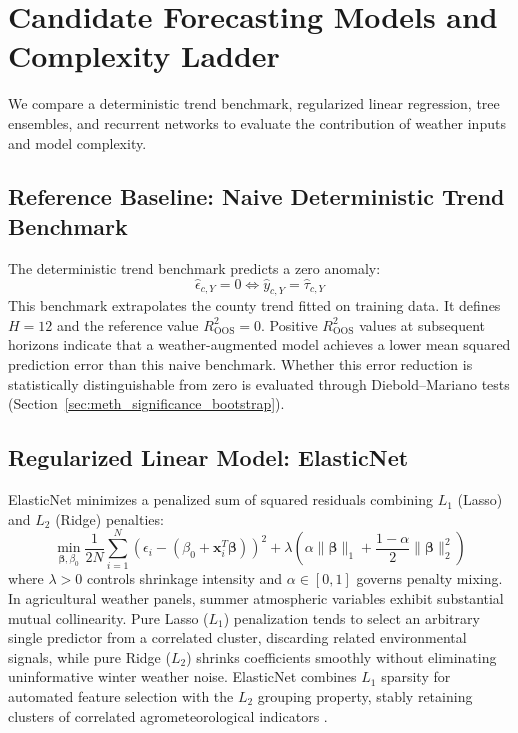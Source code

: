 
\section{Candidate Forecasting Models and Complexity Ladder}
\label{sec:meth_models}

We compare a deterministic trend benchmark, regularized linear regression, tree ensembles, and recurrent networks to evaluate the contribution of weather inputs and model complexity.

\subsection{Reference Baseline: Naive Deterministic Trend Benchmark}
\label{sec:meth_baselines}

The deterministic trend benchmark predicts a zero anomaly:
\begin{equation}
    \hat{\epsilon}_{c,Y} = 0 \iff \hat{y}_{c,Y} = \hat{\tau}_{c,Y}
    \label{eq:naive_baseline}
\end{equation}
This benchmark extrapolates the county trend fitted on training data. It defines $H=12$ and the reference value $R^2_{\text{OOS}}=0$. Positive $R^2_{\text{OOS}}$ values at subsequent horizons indicate that a weather-augmented model achieves a lower mean squared prediction error than this naive benchmark. Whether this error reduction is statistically distinguishable from zero is evaluated through Diebold--Mariano tests (Section~\ref{sec:meth_significance_bootstrap}).

\subsection{Regularized Linear Model: ElasticNet}
\label{sec:meth_elasticnet}

ElasticNet minimizes a penalized sum of squared residuals combining $L_1$ (Lasso) and $L_2$ (Ridge) penalties:
\begin{equation}
    \min_{\mathbf{\beta}, \beta_0} \frac{1}{2 N} \sum_{i=1}^{N} \left( \epsilon_i - (\beta_0 + \mathbf{x}_i^T \mathbf{\beta}) \right)^2 + \lambda \left( \alpha \|\mathbf{\beta}\|_1 + \frac{1 - \alpha}{2} \|\mathbf{\beta}\|_2^2 \right)
    \label{eq:elasticnet_objective}
\end{equation}
where $\lambda > 0$ controls shrinkage intensity and $\alpha \in [0, 1]$ governs penalty mixing. In agricultural weather panels, summer atmospheric variables exhibit substantial mutual collinearity. Pure Lasso ($L_1$) penalization tends to select an arbitrary single predictor from a correlated cluster, discarding related environmental signals, while pure Ridge ($L_2$) shrinks coefficients smoothly without eliminating uninformative winter weather noise. ElasticNet combines $L_1$ sparsity for automated feature selection with the $L_2$ grouping property, stably retaining clusters of correlated agrometeorological indicators \citep{James2023}.


